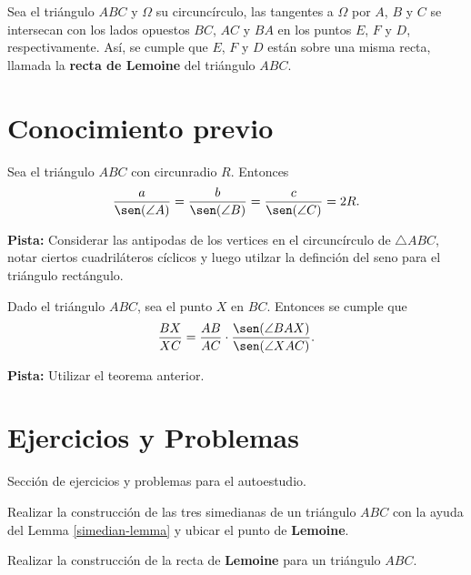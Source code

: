\begin{section-definition.tcb}
    Sea el triángulo $ABC$ y $\Omega$ su circuncírculo, las tangentes a $\Omega$ por $A$, $B$ y $C$ se intersecan con los lados opuestos $BC$, $AC$ y $BA$ en los puntos $E$, $F$ y $D$, respectivamente.
    Así, se cumple que $E$, $F$ y $D$ están sobre una misma recta, llamada la \textbf{recta de Lemoine} del triángulo $ABC$.
\end{section-definition.tcb}



\section{Conocimiento previo}

\begin{section-theorem.tcb}\label{ratio-lemma1}
    Sea el triángulo $ABC$ con circunradio $R$.
    Entonces
    \[
        \frac{a}{\sen(\angle A)} = \frac{b}{\sen(\angle B)} = \frac{c}{\sen(\angle C)} = 2R.
    \]
\end{section-theorem.tcb}

\textbf{Pista:} Considerar las antipodas de los vertices en el circuncírculo de $\triangle ABC$, notar ciertos cuadriláteros cíclicos y luego utilzar la definción del seno para el triángulo rectángulo.

\begin{section-theorem.tcb}\label{ratio-lemma}
    Dado el triángulo $ABC$, sea el punto $X$ en $BC$.
    Entonces se cumple que
    \[
        \frac{BX}{XC} = \frac{AB}{AC} \cdot \frac{\sen(\angle BAX)}{\sen(\angle XAC)}.
    \]
\end{section-theorem.tcb}

\textbf{Pista:} Utilizar el teorema anterior.



\section{Ejercicios y Problemas}
Sección de ejercicios y problemas para el autoestudio.

\begin{section-exercise}
    Realizar la construcción de las tres simedianas de un triángulo $ABC$ con la ayuda del Lemma \ref{simedian-lemma} y ubicar el punto de \textbf{Lemoine}.
\end{section-exercise}

\begin{section-exercise}
    Realizar la construcción de la recta de \textbf{Lemoine} para un triángulo $ABC$.
\end{section-exercise}

